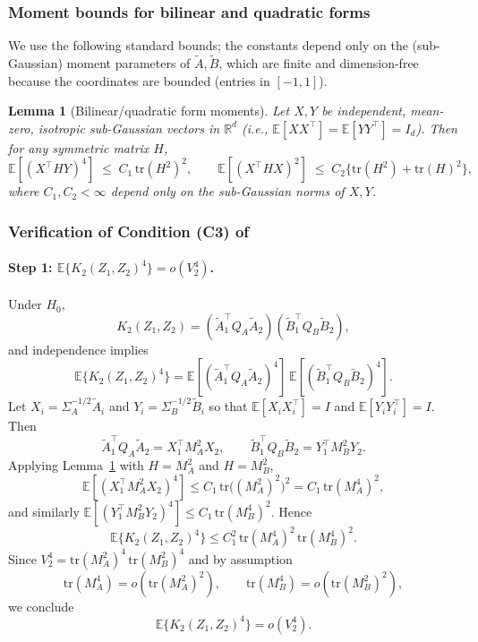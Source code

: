 \documentclass[12pt,reqno,oneside]{amsbook}
\newtheorem{lemma}[theorem]{Lemma}
\theoremstyle{definition}
\theoremstyle{remark}
\begin{document}
\subsubsection{Moment bounds for bilinear and quadratic forms}
We use the following standard bounds; the constants depend only on the
(sub-Gaussian) moment parameters of $\tilde A,\tilde B$, which are finite and
dimension-free because the coordinates are bounded (entries in $[-1,1]$).

\begin{lemma}[Bilinear/quadratic form moments]
\label{lem:bilinear-quad-moments}
Let $X,Y$ be independent, mean-zero, isotropic sub-Gaussian vectors in
$\mathbb R^d$ (i.e., $\mathbb E[XX^\top]=\mathbb E[YY^\top]=I_d$). Then for any
symmetric matrix $H$,
\[
\mathbb E[(X^\top H Y)^4]\;\le\; C_1\,\mbox{tr}(H^2)^2,
\qquad
\mathbb E[(X^\top H X)^2]\;\le\; C_2\{\mbox{tr}(H^2)+\mbox{tr}(H)^2\},
\]
where $C_1,C_2<\infty$ depend only on the sub-Gaussian norms of $X,Y$.
\end{lemma}

\subsubsection{Verification of Condition (C3) of \citet{HeZhongCuiMandrekar2023}}

\paragraph{Step 1: $\mathbb E\{K_2(Z_1,Z_2)^4\}=o(V_2^4)$.}
Under $H_0$,
\[
K_2(Z_1,Z_2)
=
(\tilde A_1^\top Q_A\tilde A_2)
(\tilde B_1^\top Q_B\tilde B_2),
\]
and independence implies
\[
\mathbb E\{K_2(Z_1,Z_2)^4\}
=
\mathbb E[(\tilde A_1^\top Q_A\tilde A_2)^4]\,
\mathbb E[(\tilde B_1^\top Q_B\tilde B_2)^4].
\]
Let $X_i=\Sigma_A^{-1/2}\tilde A_i$ and $Y_i=\Sigma_B^{-1/2}\tilde B_i$ so that
$\mathbb E[X_iX_i^\top]=I$ and $\mathbb E[Y_iY_i^\top]=I$. Then
\[
\tilde A_1^\top Q_A\tilde A_2
=
X_1^\top M_A^2 X_2,
\qquad
\tilde B_1^\top Q_B\tilde B_2
=
Y_1^\top M_B^2 Y_2.
\]
Applying Lemma~\ref{lem:bilinear-quad-moments} with $H=M_A^2$ and $H=M_B^2$,
\[
\mathbb E[(X_1^\top M_A^2 X_2)^4]\le C_1\,\mbox{tr}\!\big((M_A^2)^2\big)^2
= C_1\,\mbox{tr}(M_A^4)^2,
\]
and similarly
$\mathbb E[(Y_1^\top M_B^2 Y_2)^4]\le C_1\,\mbox{tr}(M_B^4)^2$.
Hence
\[
\mathbb E\{K_2(Z_1,Z_2)^4\}
\le
C_1^2\,\mbox{tr}(M_A^4)^2\,\mbox{tr}(M_B^4)^2.
\]
Since $V_2^4=\mbox{tr}(M_A^2)^4\,\mbox{tr}(M_B^2)^4$ and by assumption
\[
\mbox{tr}(M_A^4)=o(\mbox{tr}(M_A^2)^2),
\qquad
\mbox{tr}(M_B^4)=o(\mbox{tr}(M_B^2)^2),
\]
we conclude
\[
\mathbb E\{K_2(Z_1,Z_2)^4\}=o(V_2^4).
\]
\end{document}
